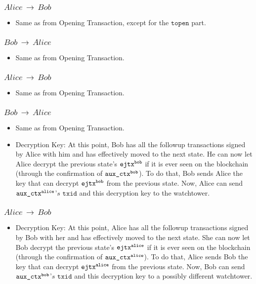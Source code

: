 \subsubsection{$Alice\,\to\,Bob$}
\begin{itemize}[leftmargin=4\parindent]
\item Same as from Opening Transaction, except for the $\texttt{topen}$ part.
\end{itemize}
\subsubsection{$Bob\,\to\,Alice$}
\begin{itemize}[leftmargin=4\parindent]
    \item Same as from Opening Transaction.
\end{itemize}
\subsubsection{$Alice\,\to\,Bob$}
\begin{itemize}[leftmargin=4\parindent]
    \item Same as from Opening Transaction.
\end{itemize}
\subsubsection{$Bob\,\to\,Alice$}
\begin{itemize}[leftmargin=4\parindent]
    \item Same as from Opening Transaction.
    \item Decryption Key: At this point, Bob has all the followup transactions signed by Alice with him and has effectively moved to the next state. He can now let Alice decrypt the previous state's $\texttt{ejtx\textsuperscript{bob}}$ if it is ever seen on the blockchain (through the confirmation of $\texttt{aux\_ctx\textsuperscript{bob}}$). To do that, Bob sends Alice the key that can decrypt $\texttt{ejtx\textsuperscript{bob}}$ from the previous state. Now, Alice can send $\texttt{aux\_ctx\textsuperscript{alice}}$'$s$ $\texttt{txid}$ and this decryption key to the watchtower.
\end{itemize}
\subsubsection{$Alice\,\to\,Bob$}        
\begin{itemize}[leftmargin=4\parindent]
    \item Decryption Key: At this point, Alice has all the followup transactions signed by Bob with her and has effectively moved to the next state. She can now let Bob decrypt the previous state's $\texttt{ejtx\textsuperscript{alice}}$ if it is ever seen on the blockchain (through the confirmation of $\texttt{aux\_ctx\textsuperscript{alice}}$). To do that, Alice sends Bob the key that can decrypt $\texttt{ejtx\textsuperscript{alice}}$ from the previous state. Now, Bob can send $\texttt{aux\_ctx\textsuperscript{bob}}$'$s$ $\texttt{txid}$ and this decryption key to a possibly different watchtower.
\end{itemize}

